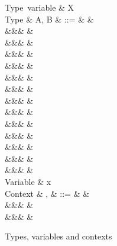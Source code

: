\begin{figure}
\begin{syntaxfig}
\mbox{Type variable}
&
X
\\[2mm]
\mbox{Type}
&
A, B
&
::=
&
&
\\
&&&
&
\\
&&&
\tyUnit
&
\\
&&&
&
\\
&&&
&
\\
&&&
&
\\
&&&
&
\\
&&&
&
\\
&&&
&
\\
&&&
&
\\
&&&
&
\\
&&&
&
\\
&&&
&
\\
&&&
&
\\[2mm]
\mbox{Variable}
&
x
\\[2mm]
\mbox{Context}
&
\Gamma, \Delta
&
::=
&
\cxtEmpty
&
\\
&&&
&
\\
&&&
&
\\[2mm]
\end{syntaxfig}
\caption{Types, variables and contexts}
\end{figure}
